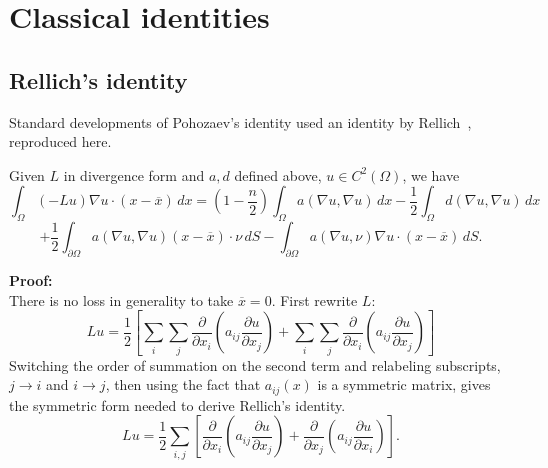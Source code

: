 \chapter{Classical identities}\label{appendix}
\section*{Rellich's identity}\label{rellich.section}
\setcounter{theorem}{0}
%
%

Standard developments of Pohozaev's identity used an identity by
Rellich~\cite{rellich:der40}, reproduced here.

\begin{lemma}[Rellich]
Given $L$ in divergence form and $a,d$ defined above, $u\in C^2
(\Omega )$, we have
\begin{equation}\label{rellich}
\int_{\Omega}(-Lu)\nabla u\cdot (x-\overline{x})\, dx
= (1-\frac{n}{2}) \int_{\Omega} a(\nabla u,\nabla u) \, dx
-
\frac{1}{2} \int_{\Omega}
d(\nabla u, \nabla u) \, dx
\end{equation}
$$
+
\frac{1}{2} \int_{\partial\Omega} a(\nabla u,\nabla u)(x-\overline{x})
\cdot \nu  \, dS
-
\int_{\partial\Omega}
a(\nabla u,\nu )\nabla u\cdot (x-\overline{x}) \, dS.
$$
\end{lemma}
{\bf Proof:}\\
There is no loss in generality to take $\overline{x} = 0$. First
rewrite $L$:
$$Lu = \frac{1}{2}\left[ \sum_{i}\sum_{j}
\frac{\partial}{\partial x_i}
\left( a_{ij} \frac{\partial u}{\partial x_j} \right) +
\sum_{i}\sum_{j}
\frac{\partial}{\partial x_i}
\left( a_{ij} \frac{\partial u}{\partial x_j} \right)
\right]$$
Switching the order of summation on the second term and relabeling
subscripts, $j \rightarrow i$ and $i \rightarrow j$, then using the fact
that $a_{ij}(x)$ is a symmetric matrix,
gives the symmetric form needed to derive Rellich's identity.
\begin{equation}
Lu = \frac{1}{2} \sum_{i,j}\left[
\frac{\partial}{\partial x_i}
\left( a_{ij} \frac{\partial u}{\partial x_j} \right) +
\frac{\partial}{\partial x_j}
\left( a_{ij} \frac{\partial u}{\partial x_i} \right)
\right].
\end{equation}

